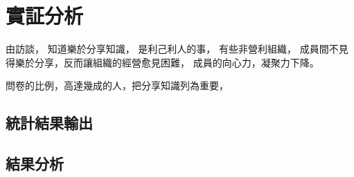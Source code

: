 \chapter{實証分析}
由訪談，
知道樂於分享知識，
是利己利人的事，
有些非營利組織，
成員間不見得樂於分享，反而讓組織的經營愈見困難，
成員的向心力，凝聚力下降。

問卷的比例，高達幾成的人，把分享知識列為重要，

\section{統計結果輸出}

\section{結果分析}





